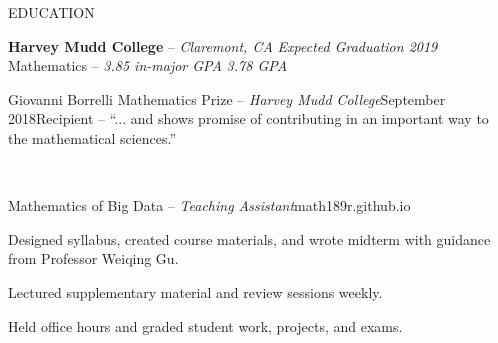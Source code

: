 \documentclass{resume} %
\begin{document}
\begin{rSection}{EDUCATION}

{{\bf Harvey Mudd College} -- {\it Claremont, CA}} \hfill {\em Expected Graduation 2019} \\ 
Mathematics -- {\em 3.85 in-major GPA} \hfill {\em 3.78 GPA}\\[-1.25em]

\begin{rSubsection}{Giovanni Borrelli Mathematics Prize -- {\it Harvey Mudd College}}{September 2018}{Recipient -- ``... and shows promise of contributing in an important way to the mathematical sciences.''}
\item\quad\\[-3.25em]
\end{rSubsection}

\begin{rSubsection}{Mathematics of Big Data -- {\it Teaching Assistant}}{\textsf{math189r.github.io}}{}

\item Designed syllabus, created course materials, and wrote midterm with guidance from Professor Weiqing Gu.
\item Lectured supplementary material and review sessions weekly.
\item Held office hours and graded student work, projects, and exams.
\end{rSubsection}
\end{rSection}
\end{document}

